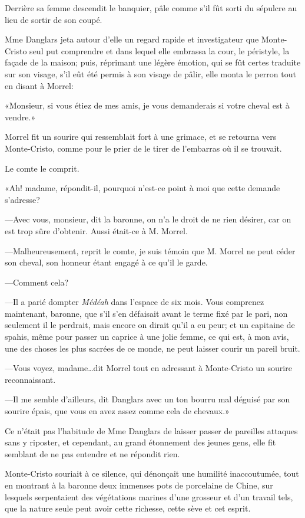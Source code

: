 Derrière sa femme descendit le banquier, pâle comme s'il fût sorti du sépulcre au lieu de sortir de son coupé. 

Mme Danglars jeta autour d'elle un regard rapide et investigateur que Monte-Cristo seul put comprendre et dans lequel elle embrassa la cour, le péristyle, la façade de la maison; puis, réprimant une légère émotion, qui se fût certes traduite sur son visage, s'il eût été permis à son visage de pâlir, elle monta le perron tout en disant à Morrel: 

«Monsieur, si vous étiez de mes amis, je vous demanderais si votre cheval est à vendre.» 

Morrel fit un sourire qui ressemblait fort à une grimace, et se retourna vers Monte-Cristo, comme pour le prier de le tirer de l'embarras où il se trouvait. 

Le comte le comprit. 

«Ah! madame, répondit-il, pourquoi n'est-ce point à moi que cette demande s'adresse? 

—Avec vous, monsieur, dit la baronne, on n'a le droit de ne rien désirer, car on est trop sûre d'obtenir. Aussi était-ce à M. Morrel. 

—Malheureusement, reprit le comte, je suis témoin que M. Morrel ne peut céder son cheval, son honneur étant engagé à ce qu'il le garde. 

—Comment cela? 

—Il a parié dompter \textit{Médéah} dans l'espace de six mois. Vous comprenez maintenant, baronne, que s'il s'en défaisait avant le terme fixé par le pari, non seulement il le perdrait, mais encore on dirait qu'il a eu peur; et un capitaine de spahis, même pour passer un caprice à une jolie femme, ce qui est, à mon avis, une des choses les plus sacrées de ce monde, ne peut laisser courir un pareil bruit. 

—Vous voyez, madame\dots dit Morrel tout en adressant à Monte-Cristo un sourire reconnaissant. 

—Il me semble d'ailleurs, dit Danglars avec un ton bourru mal déguisé par son sourire épais, que vous en avez assez comme cela de chevaux.» 

Ce n'était pas l'habitude de Mme Danglars de laisser passer de pareilles attaques sans y riposter, et cependant, au grand étonnement des jeunes gens, elle fit semblant de ne pas entendre et ne répondit rien. 

Monte-Cristo souriait à ce silence, qui dénonçait une humilité inaccoutumée, tout en montrant à la baronne deux immenses pots de porcelaine de Chine, sur lesquels serpentaient des végétations marines d'une grosseur et d'un travail tels, que la nature seule peut avoir cette richesse, cette sève et cet esprit. 

